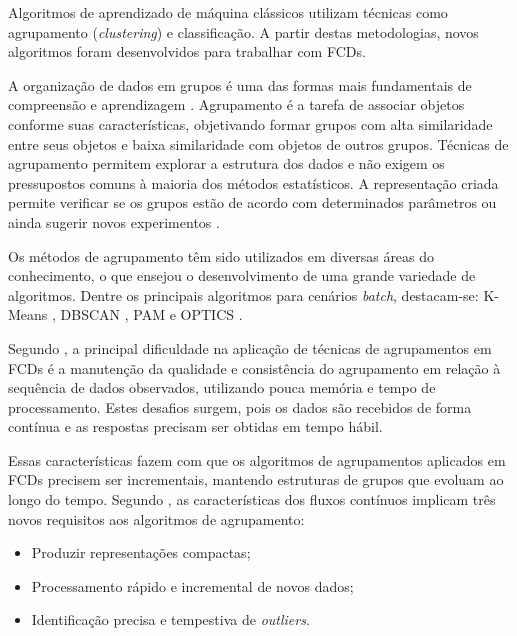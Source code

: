 \documentclass[qual, classic, a4paper]{ufbathesis}
\begin{document}
Algoritmos de aprendizado de máquina clássicos utilizam técnicas como agrupamento (\textit{clustering}) e classificação.
A partir destas metodologias, novos algoritmos foram desenvolvidos para trabalhar com FCDs.

A organização de dados em grupos é uma das formas mais fundamentais de compreensão e aprendizagem \cite{Jain:1988:ACD:46712}.
Agrupamento é a tarefa de associar objetos conforme suas características, objetivando formar grupos com alta similaridade entre seus objetos e baixa similaridade com objetos de outros grupos.
Técnicas de agrupamento permitem explorar a estrutura dos dados e não exigem os pressupostos comuns à maioria dos métodos estatísticos.
A representação criada permite verificar se os grupos estão de acordo com determinados parâmetros ou ainda sugerir novos experimentos \cite{Jain:1988:ACD:46712}.

Os métodos de agrupamento têm sido utilizados em diversas áreas do conhecimento, o que ensejou o desenvolvimento de uma grande variedade de algoritmos.
Dentre os principais algoritmos para cenários \textit{batch}, destacam-se:
K-Means \cite{Lloyd:2006:LSQ:2263356.2269955},
DBSCAN \cite{Ester:1996:DAD:3001460.3001507},
PAM \cite{kaufman:clustering1990} e 
OPTICS \cite{Ankerst:1999:OOP:304181.304187}.

Segundo \cite{Gama:2010:KDD:1855075}, a principal dificuldade na aplicação de técnicas de agrupamentos em FCDs é 
a manutenção da qualidade e consistência do agrupamento em relação à sequência de dados observados, utilizando pouca memória e tempo de processamento. 
Estes desafios surgem, pois os dados são recebidos de forma contínua e as respostas precisam ser obtidas em tempo hábil.

Essas características fazem com que os algoritmos de agrupamentos aplicados em FCDs precisem ser incrementais, mantendo estruturas de grupos que evoluam ao longo do tempo.
Segundo \cite{Barbara:2002:RCD:507515.507519}, as características dos fluxos contínuos implicam três novos requisitos aos algoritmos de agrupamento:

\begin{itemize}
    \item Produzir representações compactas;
    \item Processamento rápido e incremental de novos dados;
    \item Identificação precisa e tempestiva de \textit{outliers}.
\end{itemize}
\end{document}
